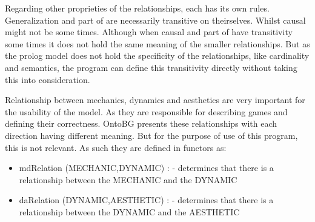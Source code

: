 Regarding other proprieties of the relationships, each has its own rules. Generalization and part of are necessarily transitive on theirselves. Whilst causal might not be some times. Although when causal and part of have transitivity some times it does not hold the same meaning of the smaller relationships. But as the prolog model does not hold the specificity of the relationships, like cardinality and semantics, the program can define this transitivity directly without taking this into consideration.

Relationship between mechanics, dynamics and aesthetics are very important for the usability of the model. As they are responsible for describing games and defining their correctness. OntoBG presents these relationships with each direction having different meaning. But for the purpose of use of this program, this is not relevant. As such they are defined in functors as:
\begin{itemize}
    \item mdRelation (MECHANIC,DYNAMIC) : - determines that there is a relationship between the MECHANIC and the DYNAMIC
    \item daRelation (DYNAMIC,AESTHETIC) : - determines that there is a relationship between the DYNAMIC and the AESTHETIC
\end{itemize}